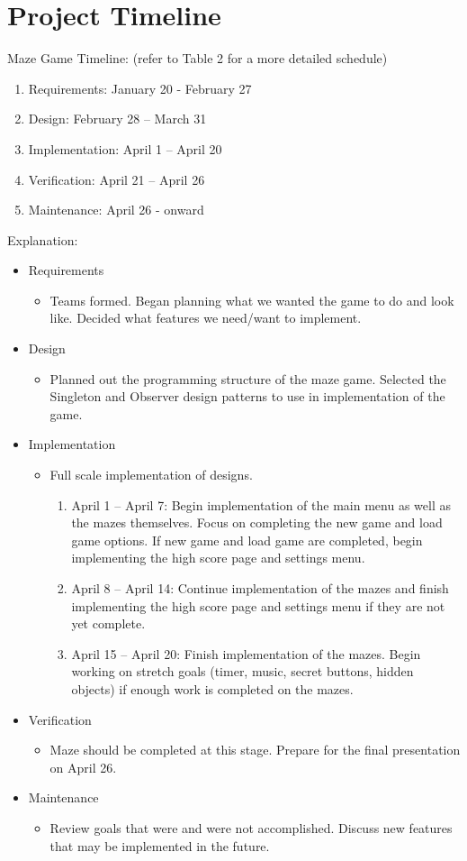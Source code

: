 \documentclass[10pt,conference,onecolumn,compsoc]{IEEEtran}
\begin{document}
\section{Project Timeline}

Maze Game Timeline: (refer to Table 2 for a more detailed schedule)
\begin{enumerate}
\item Requirements: January 20 - February 27
\item Design: February 28 – March 31
\item Implementation: April 1 – April 20
\item Verification: April 21 – April 26
\item Maintenance: April 26 - onward
\end{enumerate}
Explanation: 
\begin{itemize} 
\item Requirements
\begin{itemize}
\item Teams formed. Began planning what we wanted the game to do and look like. Decided what features we need/want to implement.
\end{itemize}
\item Design
\begin{itemize}
\item Planned out the programming structure of the maze game. Selected the Singleton and Observer design patterns to use in implementation of the game.
\end{itemize}
\item Implementation
\begin{itemize}
\item Full scale implementation of designs.
\begin{enumerate}
\item April 1 – April 7: Begin implementation of the main menu as well as the mazes themselves. Focus on completing the new game and load game options. If new game and load game are completed, begin implementing the high score page and settings menu.
\item April 8 – April 14: Continue implementation of the mazes and finish implementing the high score page and settings menu if they are not yet complete.
\item April 15 – April 20: Finish implementation of the mazes. Begin working on stretch goals (timer, music, secret buttons, hidden objects) if enough work is completed on the mazes.
\end{enumerate}
\end{itemize}
\item Verification
\begin{itemize}
\item Maze should be completed at this stage. Prepare for the final presentation on April 26.
\end{itemize}
\item Maintenance
\begin{itemize}
\item Review goals that were and were not accomplished. Discuss new features that may be implemented in the future.
\end{itemize}
\end{itemize} 
\end{document}
